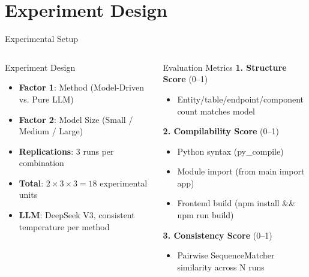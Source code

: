 \documentclass[10pt,aspectratio=169]{beamer}
\begin{document}
\section{Experiment Design}
\begin{frame}{Experimental Setup}
\vspace{-5pt}

\begin{columns}[T]
\begin{block}{Experiment Design}
\begin{itemize}
    \item \textbf{Factor 1}: Method (Model-Driven vs. Pure LLM)
    \item \textbf{Factor 2}: Model Size (Small / Medium / Large)
    \item \textbf{Replications}: 3 runs per combination
    \item \textbf{Total}: $2 \times 3 \times 3 = 18$ experimental units
    \item \textbf{LLM}: DeepSeek V3, consistent temperature per method
\end{itemize}
\end{block}

\begin{block}{Evaluation Metrics}
\textbf{1. Structure Score} (0--1)
\begin{itemize}
    \item Entity/table/endpoint/component count matches model
\end{itemize}
\textbf{2. Compilability Score} (0--1)
\begin{itemize}
    \item Python syntax (py\_compile)
    \item Module import (from main import app)
    \item Frontend build (npm install \&\& npm run build)
\end{itemize}
\textbf{3. Consistency Score} (0--1)
\begin{itemize}
    \item Pairwise SequenceMatcher similarity across N runs
\end{itemize}
\end{block}
\end{columns}


\end{frame}
\end{document}

